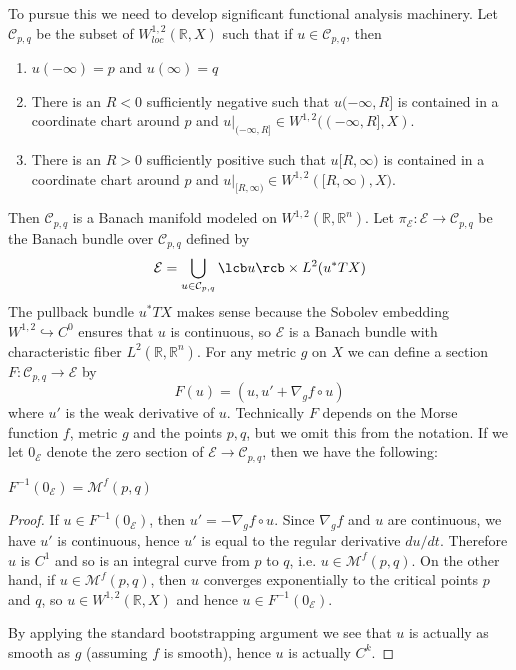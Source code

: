 To pursue this we need to develop significant functional analysis machinery. Let $\mathcal C_{p,q}$ be the subset of $W^{1,2}_{loc}(\mathbb R,X)$ such that if $u \in \mathcal C_{p,q}$, then
\begin{enumerate}
	\item $u(-\infty)=p$ and $u(\infty)=q$
	\item There is an $R<0$ sufficiently negative such that $u(-\infty,R]$ is contained in a coordinate chart around $p$ and $u|_{(-\infty,R]} \in W^{1,2}((-\infty,R],X)$.
	\item There is an $R>0$ sufficiently positive such that $u[R,\infty)$ is contained in a coordinate chart around $p$ and $u|_{[R,\infty)} \in W^{1,2}([R,\infty),X)$.
\end{enumerate}
Then $\mathcal C_{p,q}$ is a Banach manifold modeled on $W^{1,2}(\mathbb R,\mathbb R^n)$. Let $\pi_{\mathcal E} : \mathcal E \rightarrow \mathcal C_{p,q}$ be the Banach bundle over $\mathcal C_{p,q}$ defined by
\[ \mathcal E = \bigcup_{u \in \mathcal C_{p,q}} \lcb u \rcb \times L^2(u^* TX) \]
The pullback bundle $u^* TX$ makes sense because the Sobolev embedding $W^{1,2} \hookrightarrow C^0$ ensures that $u$ is continuous, so $\mathcal E$ is a Banach bundle with characteristic fiber $L^2(\mathbb R,\mathbb R^n)$. For any metric $g$ on $X$ we can define a section $F : \mathcal C_{p,q} \rightarrow \mathcal E$ by
\[ F(u) = (u,u'+\nabla_g f \circ u) \]
where $u'$ is the weak derivative of $u$. Technically $F$ depends on the Morse function $f$, metric $g$ and the points $p,q$, but we omit this from the notation. If we let ${0}_{\mathcal E}$ denote the zero section of $\mathcal E \rightarrow \mathcal C_{p,q}$, then we have the following:
\begin{prop}
$F^{-1}({0}_{\mathcal E}) = \mathcal M^f(p,q)$
\end{prop}
\begin{proof}
If $u \in F^{-1}(0_{\mathcal E})$, then $u' = -\nabla_g f \circ u$. Since $\nabla_g f$ and $u$ are continuous, we have $u'$ is continuous, hence $u'$ is equal to the regular derivative $du/dt$. Therefore $u$ is $C^1$ and so is an integral curve from $p$ to $q$, i.e. $u \in \mathcal M^f(p,q)$. On the other hand, if $u \in \mathcal M^f(p,q)$, then $u$ converges exponentially to the critical points $p$ and $q$, so $u \in W^{1,2}(\mathbb R,X)$ and hence $u \in F^{-1}(0_{\mathcal E})$.

By applying the standard bootstrapping argument we see that $u$ is actually as smooth as $g$ (assuming $f$ is smooth), hence $u$ is actually $C^k$.
\end{proof}


